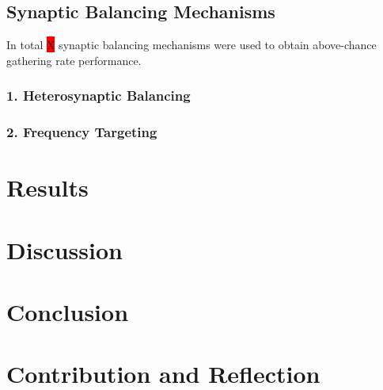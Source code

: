 \documentclass[11pt, twocolumn]{article}
\begin{document}
\subsection*{Synaptic Balancing Mechanisms}
In total \colorbox{red}{X} synaptic balancing mechanisms were used to obtain above-chance gathering rate performance.
\subsubsection*{1. Heterosynaptic Balancing}
\subsubsection*{2. Frequency Targeting}

\section*{Results}

\section*{Discussion}

\section*{Conclusion}

\printbibliography{}

\section*{Contribution and Reflection}
\end{document}
